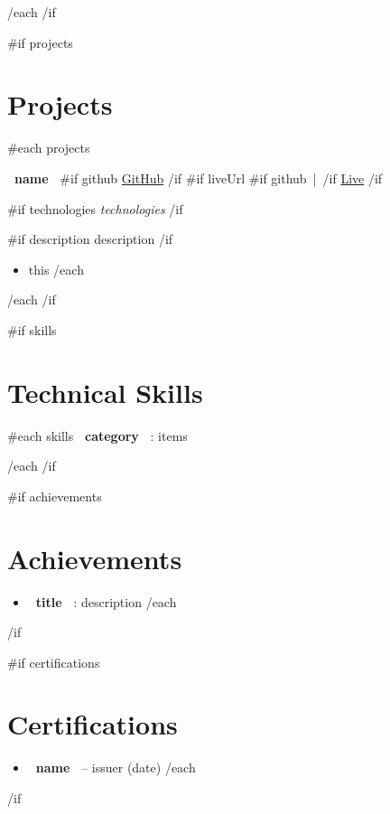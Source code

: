 \documentclass[10pt,a4paper]{article}
\begin{document}
{{/each}}
{{/if}}


{{#if projects}}
\section{Projects}

{{#each projects}}

\noindent
\textbf{ {{~name~}} }
\hfill
{{#if github}}
\href{ {{~github~}} }{GitHub}
{{/if}}
{{#if liveUrl}}
{{#if github}} \,|\, {{/if}}
\href{ {{~liveUrl~}} }{Live}
{{/if}}

{{#if technologies}}
\textit{ {{technologies}} }
{{/if}}

{{#if description}}
{{description}}
{{/if}}

\begin{itemize}
{{#each bullets}}
    \item {{this}}
{{/each}}
\end{itemize}

{{/each}}
{{/if}}


{{#if skills}}
\section{Technical Skills}

{{#each skills}}
\textbf{ {{~category~}} }: {{items}}

{{/each}}
{{/if}}


{{#if achievements}}
\section{Achievements}

\begin{itemize}
{{#each achievements}}
    \item \textbf{ {{~title~}} }: {{description}}
{{/each}}
\end{itemize}

{{/if}}


{{#if certifications}}
\section{Certifications}

\begin{itemize}
{{#each certifications}}
    \item \textbf{ {{~name~}} } -- {{issuer}} ({{date}})
{{/each}}
\end{itemize}

{{/if}}
\end{document}
